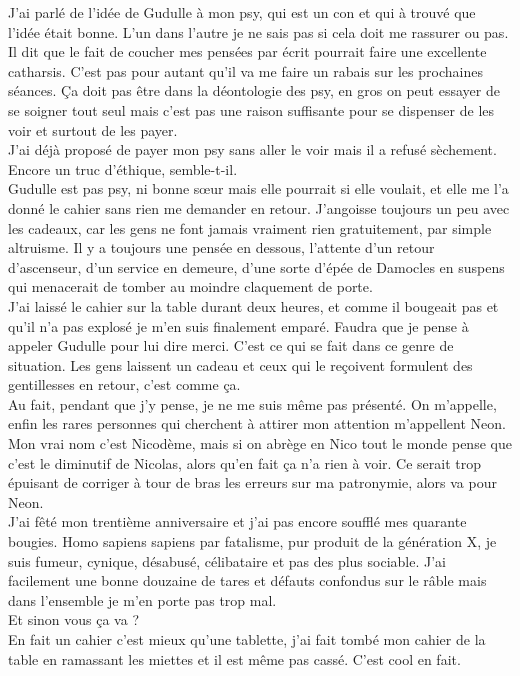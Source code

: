 J'ai parlé de l'idée de Gudulle à mon psy, qui est un con et qui à trouvé que l'idée était bonne. L'un dans l'autre je ne sais pas si cela doit me rassurer ou pas. Il dit que le fait de coucher mes pensées par écrit pourrait faire une excellente catharsis. C'est pas pour autant qu'il va me faire un rabais sur les prochaines séances. Ça doit pas être dans la déontologie des psy, en gros on peut essayer de se soigner tout seul mais c'est pas une raison suffisante pour se dispenser de les voir et surtout de les payer.\\
J'ai déjà proposé de payer mon psy sans aller le voir mais il a refusé sèchement. Encore un truc d'éthique, semble-t-il. \\

Gudulle est pas psy, ni bonne sœur mais elle pourrait si elle voulait, et elle me l'a donné le cahier sans rien me demander en retour. J'angoisse toujours un peu avec les cadeaux, car les gens ne font jamais vraiment rien gratuitement, par simple altruisme. Il y a toujours une pensée en dessous, l'attente d'un retour d'ascenseur, d'un service en demeure, d'une sorte d'épée de Damocles en suspens qui menacerait de tomber au moindre claquement de porte.\\

J'ai laissé le cahier sur la table durant deux heures, et comme il bougeait pas et qu'il n'a pas explosé je m'en suis finalement emparé. Faudra que je pense à appeler Gudulle pour lui dire merci. C'est ce qui se fait dans ce genre de situation. Les gens laissent un cadeau et ceux qui le reçoivent formulent des gentillesses en retour, c'est comme ça.\\

Au fait, pendant que j'y pense, je ne me suis même pas présenté. On m'appelle, enfin les rares personnes qui cherchent à attirer mon attention m'appellent Neon. Mon vrai nom c'est Nicodème, mais si on abrège en Nico tout le monde pense que c'est le diminutif de Nicolas, alors qu'en fait ça n'a rien à voir. Ce serait trop épuisant de corriger à tour de bras les erreurs sur ma patronymie, alors va pour Neon. \\
J'ai fêté mon trentième anniversaire et j'ai pas encore soufflé mes quarante bougies. Homo sapiens sapiens par fatalisme, pur produit de la génération X, je suis fumeur, cynique, désabusé, célibataire et pas des plus sociable. J'ai facilement une bonne douzaine de tares et défauts confondus sur le râble mais dans l'ensemble je m'en porte pas trop mal. \\

Et sinon vous ça va ? \\

En fait un cahier c'est mieux qu'une tablette, j'ai fait tombé mon cahier de la table en ramassant les miettes et il est même pas cassé. C'est cool en fait.